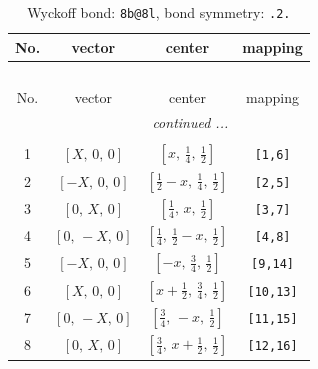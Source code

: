 \documentclass[fleqn,8pt]{jsarticle}
\begin{document}
\begin{longtable}{cccc}
\caption{Wyckoff bond: {\tt 8b@8l}, bond symmetry: {\tt .2.}}
 \\
 \hline \hline
No. & vector & center & mapping \\ \hline \endfirsthead

\multicolumn{3}{l}{\tablename\ \thetable{}} \\
 \hline \hline
No. & vector & center & mapping \\ \hline \endhead

 \hline \hline
\multicolumn{3}{r}{\footnotesize\it continued ...} \\ \endfoot

 \hline \hline
\multicolumn{3}{r}{} \\ \endlastfoot

1 & $\left[ X,\, 0,\, 0 \right]$ & $\left[ x,\, \frac{1}{4},\, \frac{1}{2} \right]$ & {\tt [1,6]} \\ \hline
2 & $\left[ - X,\, 0,\, 0 \right]$ & $\left[ \frac{1}{2} - x,\, \frac{1}{4},\, \frac{1}{2} \right]$ & {\tt [2,5]} \\ \hline
3 & $\left[ 0,\, X,\, 0 \right]$ & $\left[ \frac{1}{4},\, x,\, \frac{1}{2} \right]$ & {\tt [3,7]} \\ \hline
4 & $\left[ 0,\, - X,\, 0 \right]$ & $\left[ \frac{1}{4},\, \frac{1}{2} - x,\, \frac{1}{2} \right]$ & {\tt [4,8]} \\ \hline
5 & $\left[ - X,\, 0,\, 0 \right]$ & $\left[ - x,\, \frac{3}{4},\, \frac{1}{2} \right]$ & {\tt [9,14]} \\ \hline
6 & $\left[ X,\, 0,\, 0 \right]$ & $\left[ x + \frac{1}{2},\, \frac{3}{4},\, \frac{1}{2} \right]$ & {\tt [10,13]} \\ \hline
7 & $\left[ 0,\, - X,\, 0 \right]$ & $\left[ \frac{3}{4},\, - x,\, \frac{1}{2} \right]$ & {\tt [11,15]} \\ \hline
8 & $\left[ 0,\, X,\, 0 \right]$ & $\left[ \frac{3}{4},\, x + \frac{1}{2},\, \frac{1}{2} \right]$ & {\tt [12,16]} \\
\end{longtable}
\renewcommand{\arraystretch}{1.2}
\end{document}
